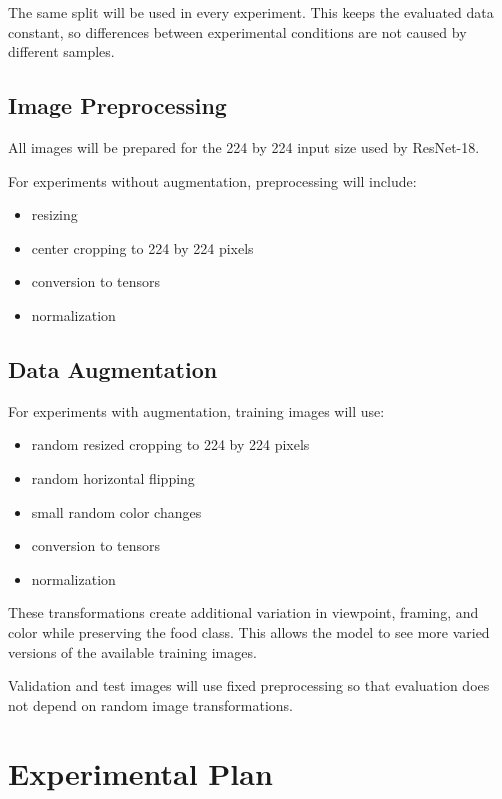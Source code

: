 \documentclass[11pt,a4paper]{article}
\begin{document}
The same split will be used in every experiment. This keeps the evaluated data constant,
so differences between experimental conditions are not caused by different samples.

\subsection{Image Preprocessing}

All images will be prepared for the 224 by 224 input size used by ResNet-18.

For experiments without augmentation, preprocessing will include:

\begin{itemize}
    \item resizing
    \item center cropping to 224 by 224 pixels
    \item conversion to tensors
    \item normalization
\end{itemize}

\subsection{Data Augmentation}

For experiments with augmentation, training images will use:

\begin{itemize}
    \item random resized cropping to 224 by 224 pixels
    \item random horizontal flipping
    \item small random color changes
    \item conversion to tensors
    \item normalization
\end{itemize}

These transformations create additional variation in viewpoint, framing, and color
while preserving the food class. This allows the model to see more varied versions
of the available training images.

Validation and test images will use fixed preprocessing so that evaluation does not
depend on random image transformations.


\section{Experimental Plan}
\end{document}
